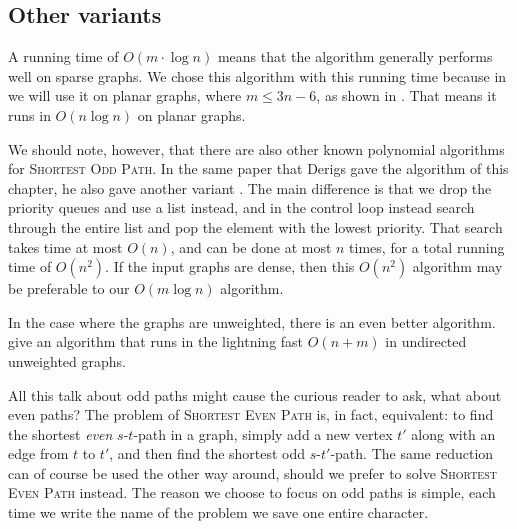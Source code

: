 \subsection{Other variants}
A running time of $O(m \cdot \log n)$ means that the algorithm generally performs well on sparse graphs. We chose this algorithm with this running time because in  we will use it on planar graphs, where $m \leq 3n-6$, as shown in . That means it runs in $O(n \log n)$ on planar graphs.

We should note, however, that there are also other known polynomial algorithms for \textsc{Shortest Odd Path}. In the same paper that Derigs gave the algorithm of this chapter, he also gave another variant \cite{source:derigs_shortest_odd_path}. The main difference is that we drop the priority queues and use a list instead, and in the control loop instead search through the entire list and pop the element with the lowest priority. That search takes time at most $O(n)$, and can be done at most $n$ times, for a total running time of $O(n^2)$. If the input graphs are dense, then this $O(n^2)$ algorithm may be preferable to our $O(m \log n)$ algorithm.

In the case where the graphs are unweighted, there is an even better algorithm. \cite{source:the-even-path-problem-for-graphs-and-digraphs} give an algorithm that runs in the lightning fast $O(n + m)$ in undirected unweighted graphs.

All this talk about odd paths might cause the curious reader to ask, what about even paths? The problem of \textsc{Shortest Even Path} is, in fact, equivalent: to find the shortest \emph{even} $s$-$t$-path in a graph, simply add a new vertex $t'$ along with an edge from $t$ to $t'$, and then find the shortest odd $s$-$t'$-path. The same reduction can of course be used the other way around, should we prefer to solve \textsc{Shortest Even Path} instead. The reason we choose to focus on odd paths is simple, each time we write the name of the problem we save one entire character.

